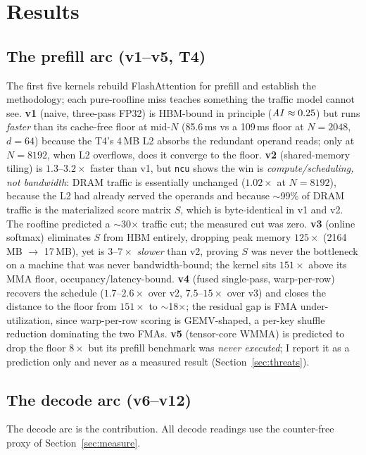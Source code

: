 \section{Results}
\label{sec:results}

\subsection{The prefill arc (v1--v5, T4)}
\label{sec:results-prefill}
The first five kernels rebuild FlashAttention for prefill and establish the
methodology; each pure-roofline miss teaches something the traffic model cannot
see. \textbf{v1} (naive, three-pass FP32) is HBM-bound in principle
($\mathit{AI} \approx 0.25$) but runs \emph{faster} than its cache-free floor at mid-$N$
(85.6\,ms vs a 109\,ms floor at $N{=}2048$, $d{=}64$) because the T4's 4\,MB L2
absorbs the redundant operand reads; only at $N{=}8192$, when L2 overflows, does
it converge to the floor. \textbf{v2} (shared-memory tiling) is
$1.3$--$3.2\times$ faster than v1, but \texttt{ncu} shows the win is
\emph{compute/scheduling, not bandwidth}: DRAM traffic is essentially unchanged
($1.02\times$ at $N{=}8192$), because the L2 had already served the operands and
because $\sim$99\% of DRAM traffic is the materialized score matrix $S$, which is
byte-identical in v1 and v2. The roofline predicted a $\sim$30$\times$ traffic
cut; the measured cut was zero. \textbf{v3} (online softmax) eliminates $S$ from
HBM entirely, dropping peak memory $125\times$ (2164\,MB $\to$ 17\,MB), yet is
$3$--$7\times$ \emph{slower} than v2, proving $S$ was never the bottleneck on a
machine that was never bandwidth-bound; the kernel sits $151\times$ above its MMA
floor, occupancy/latency-bound. \textbf{v4} (fused single-pass, warp-per-row)
recovers the schedule ($1.7$--$2.6\times$ over v2, $7.5$--$15\times$ over v3) and
closes the distance to the floor from $151\times$ to $\sim$18$\times$; the
residual gap is FMA under-utilization, since warp-per-row scoring is GEMV-shaped,
a per-key shuffle reduction dominating the two FMAs. \textbf{v5} (tensor-core WMMA)
is predicted to drop the floor $8\times$ but its prefill benchmark was
\emph{never executed}; I report it as a prediction only and never as a measured
result (Section~\ref{sec:threats}).

\subsection{The decode arc (v6--v12)}
\label{sec:results-decode}
The decode arc is the contribution. All decode readings use the counter-free
proxy of Section~\ref{sec:measure}.

